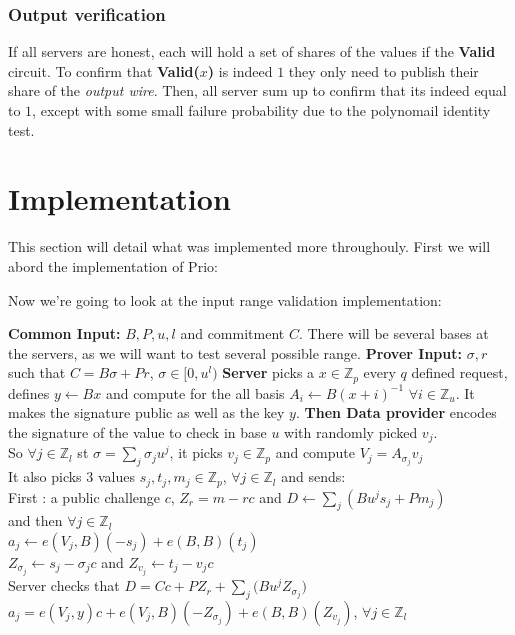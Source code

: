\documentclass{article}
\begin{document}
\subsubsection{Output verification}
If all servers are honest, each will hold a set of shares of the values if the \textbf{Valid} circuit. To confirm that \textbf{Valid($x$)} is indeed $1$ they only need to publish their share of the \textit{output wire}. Then, all server sum up to confirm that its indeed equal to $1$, except with some small failure probability due to the polynomail identity test.


\section{Implementation}
 This section will detail what was implemented more throughouly.
First we will abord the implementation of Prio:

Now we're going to look at the input range validation implementation:
\begin{algorithmic}[1]
\State \textbf{Common Input:} $B, P, u, l$ and commitment $C$. There will be several bases at the servers, as we will want to test several possible range.
\State \textbf{Prover Input:} $\sigma, r$ such that $C = B\sigma + Pr$, $\sigma \in [0,u^l)$
\State  \textbf{Server} picks a $x \in \mathbb{Z}_p$ every $q$ defined request, defines $y \gets Bx$ and compute for the all basis $A_i \gets B(x+i)^{-1}$ $ \forall i \in \mathbb{Z}_u$. It makes the signature public as well as the key $y$.
\State \textbf{Then Data provider} encodes the signature of the value to check in base $u$ with randomly picked $v_j$.\\
So $\forall j \in \mathbb{Z}_l $ st $ \sigma = \sum_{j}{\sigma_j u^j}$, it picks $v_j \in \mathbb{Z}_p$ and compute $V_j = A_{\sigma_j}v_j$\\
It also picks 3 values $s_j,t_j,m_j \in \mathbb{Z}_p $, $\forall j \in \mathbb{Z}_l$ and sends:\\
First : a public challenge $c$, $Z_r = m-rc$ and $D \gets \sum_{j}{(Bu^j s_j + Pm_j)}$\\
and then $ \forall j \in \mathbb{Z}_l$\\
$a_j \gets e(V_j,B)(-s_j)+e(B,B)(t_j)$\\ $Z_{\sigma_j} \gets s_j-\sigma_j c$ and $Z_{v_j} \gets t_j-v_j c$\\
\State Server checks that $D = Cc + PZ_r + \sum_{j}{(Bu^j Z_{\sigma_j}}) $\\
$a_j = e(V_j,y)c + e(V_j,B)(-Z_{\sigma_j}) + e(B,B)(Z_{v_j})$, $\forall j \in \mathbb{Z}_l$
\end{algorithmic}
\end{document}

